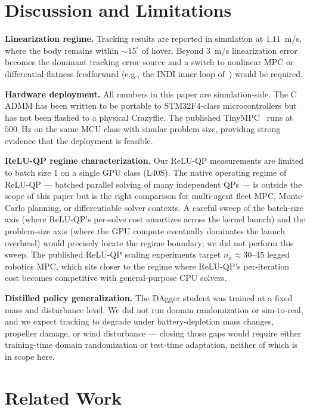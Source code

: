 \documentclass[conference]{IEEEtran}
\begin{document}
\section{Discussion and Limitations}

\textbf{Linearization regime.} Tracking results are reported in simulation at $1.11$~m/s, where the body remains within $\sim 15^\circ$ of hover. Beyond $3$~m/s linearization error becomes the dominant tracking error source and a switch to nonlinear MPC or differential-flatness feedforward (e.g., the INDI inner loop of~\cite{tal2021indi}) would be required.

\textbf{Hardware deployment.} All numbers in this paper are simulation-side. The C ADMM has been written to be portable to STM32F4-class microcontrollers but has not been flashed to a physical Crazyflie. The published TinyMPC~\cite{nguyen2024tinympc} runs at $500$~Hz on the same MCU class with similar problem size, providing strong evidence that the deployment is feasible.

\textbf{ReLU-QP regime characterization.} Our ReLU-QP measurements are limited to batch size $1$ on a single GPU class (L40S). The native operating regime of ReLU-QP --- batched parallel solving of many independent QPs --- is outside the scope of this paper but is the right comparison for multi-agent fleet MPC, Monte-Carlo planning, or differentiable solver contexts. A careful sweep of the batch-size axis (where ReLU-QP's per-solve cost amortizes across the kernel launch) and the problem-size axis (where the GPU compute eventually dominates the launch overhead) would precisely locate the regime boundary; we did not perform this sweep. The published ReLU-QP scaling experiments target $n_x \approx 30$--$45$ legged robotics MPC, which sits closer to the regime where ReLU-QP's per-iteration cost becomes competitive with general-purpose CPU solvers.

\textbf{Distilled policy generalization.} The DAgger student was trained at a fixed mass and disturbance level. We did not run domain randomization or sim-to-real, and we expect tracking to degrade under battery-depletion mass changes, propeller damage, or wind disturbance --- closing those gaps would require either training-time domain randomization or test-time adaptation, neither of which is in scope here.

\section{Related Work}
\end{document}
